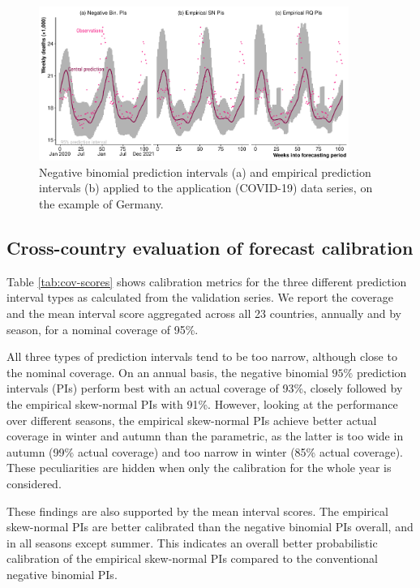 \documentclass[12pt]{article}
\begin{document}
\begin{figure}[ht!]
    \centering
    \includegraphics[width=0.9\textwidth]{fig/22-application.pdf}
     \caption{Negative binomial prediction intervals (a) and empirical prediction intervals (b) applied to the application (COVID-19) data series, on the example of Germany.}
     \label{fig:PIs_application_series}
\end{figure}

\subsection*{Cross-country evaluation of forecast calibration}

Table \ref{tab:cov-scores} shows calibration metrics for the three different prediction interval types as calculated from the validation series. We report the coverage and the mean interval score aggregated across all 23 countries, annually and by season, for a nominal coverage of 95\%.

All three types of prediction intervals tend to be too narrow, although close to the nominal coverage. On an annual basis, the negative binomial $95\%$ prediction intervals (PIs) perform best with an actual coverage of 93\%, closely followed by the empirical skew-normal PIs with 91\%. However, looking at the performance over different seasons, the empirical skew-normal PIs achieve better actual coverage in winter and autumn than the parametric, as the latter is too wide in autumn (99\% actual coverage) and too narrow in winter (85\% actual coverage). These peculiarities are hidden when only the calibration for the whole year is considered.

These findings are also supported by the mean interval scores. The empirical skew-normal PIs are better calibrated than the negative binomial PIs overall, and in all seasons except summer. This indicates an overall better probabilistic calibration of the empirical skew-normal PIs compared to the conventional negative binomial PIs.
\end{document}
